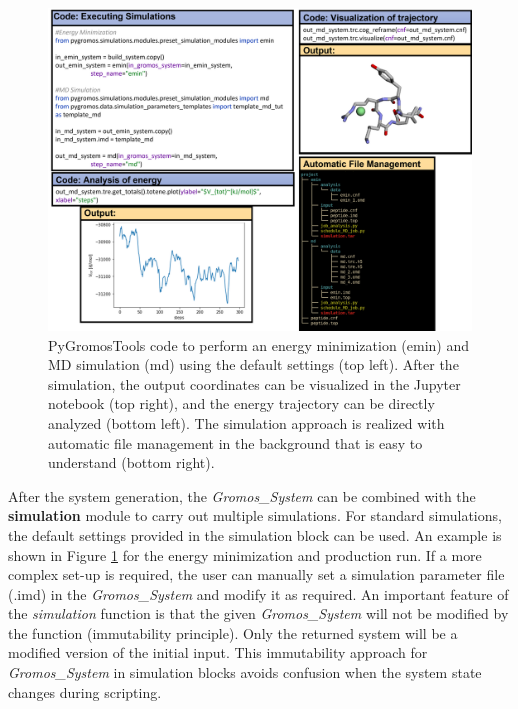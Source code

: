 \begin{figure}[h!]
    \centering
    \includegraphics[width=\textwidth]{fig/ApplicationExamples/codeExample_GROMOSSystemSimulation.png}
    \caption{PyGromosTools code to perform an energy minimization (emin) and MD simulation (md) using the default settings (top left). After the simulation, the output coordinates can be visualized in the Jupyter notebook (top right), and the energy trajectory can be directly analyzed (bottom left). The simulation approach is realized with automatic file management in the background that is easy to understand (bottom right).}
    \label{fig: GROMOSSystemSimulationExample}
\end{figure}

After the system generation, the \textit{Gromos\_System} can be combined with the \textbf{simulation} module to carry out multiple simulations. For standard simulations, the default settings provided in the simulation block can be used. An example is shown in Figure \ref{fig: GROMOSSystemSimulationExample} for the energy minimization and production run. If a more complex set-up is required, the user can manually set a simulation parameter file (.imd) in the \textit{Gromos\_System} and modify it as required. An important feature of the \textit{simulation} function is that the given \textit{Gromos\_System} will not be modified by the function (immutability principle). Only the returned system will be a modified version of the initial input. This immutability approach for \textit{Gromos\_System} in simulation blocks avoids confusion when the system state changes during scripting. 

